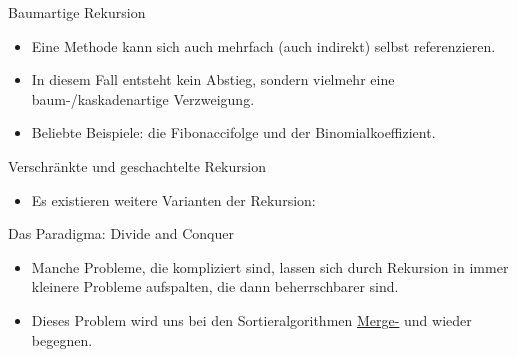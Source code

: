 \begin{frame}[fragile]{Baumartige Rekursion}
    \begin{itemize}[<+(1)->]
        \widei
        \item Eine Methode kann sich auch mehrfach (auch indirekt) selbst referenzieren.
        \item In diesem Fall entsteht kein  Abstieg,\pause{} sondern vielmehr eine baum-/kaskadenartige Verzweigung.
        \item Beliebte Beispiele: die Fibonaccifolge und der Binomialkoeffizient.
    \end{itemize}
    \vfill\hbox{}
\end{frame}


\begin{frame}{Verschränkte und geschachtelte Rekursion}
    \begin{itemize}[<+(1)->]
        \widei
        \item Es existieren weitere Varianten der Rekursion: 
    \end{itemize}
\end{frame}

\begin{frame}{Das Paradigma: Divide and Conquer}
    \begin{itemize}[<+(1)->]
        \widei
        \item Manche Probleme, die kompliziert sind,\pause{} lassen sich durch Rekursion in immer kleinere Probleme aufspalten, die dann beherrschbarer sind.
        \item Dieses Problem wird uns bei den Sortieralgorithmen \hyperlink{mrk:sort-Mergesort}{Merge-} und  wieder begegnen.
    \end{itemize}
\end{frame}

